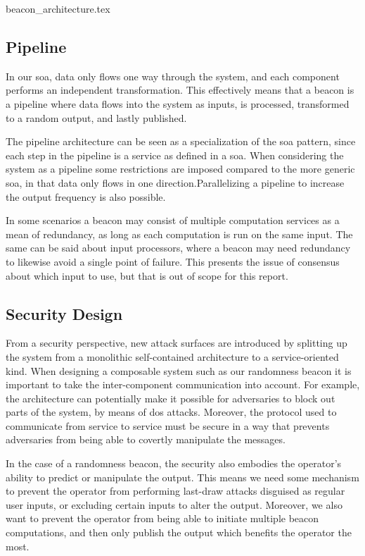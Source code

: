 {beacon_architecture.tex}

\subsection{Pipeline}%
\label{sub:pipeline}
In our \gls{soa}, data only flows one way through the system, and each component performs an independent transformation.
This effectively means that a beacon is a pipeline where data flows into the system as inputs, is processed, transformed to a random output, and lastly published.

The pipeline architecture can be seen as a specialization of the \gls{soa} pattern, since each step in the pipeline is a service as defined in a \gls{soa}.
When considering the system as a pipeline some restrictions are imposed compared to the more generic \gls{soa}, in that data only flows in one direction.Parallelizing a pipeline to increase the output frequency is also possible.

In some scenarios a beacon may consist of multiple computation services as a mean of redundancy, as long as each computation is run on the same input.
The same can be said about input processors, where a beacon may need redundancy to likewise avoid a single point of failure.
This presents the issue of consensus about which input to use, but that is out of scope for this report.

\subsection{Security Design}

From a security perspective, new attack surfaces are introduced by splitting up the system from a monolithic self-contained architecture to a service-oriented kind.
When designing a composable system such as our randomness beacon it is important to take the inter-component communication into account.
For example, the architecture can potentially make it possible for adversaries to block out parts of the system, by means of \gls{dos} attacks.
Moreover, the protocol used to communicate from service to service must be secure in a way that prevents adversaries from being able to covertly manipulate the messages.

In the case of a randomness beacon, the security also embodies the operator's ability to predict or manipulate the output.
This means we need some mechanism to prevent the operator from performing last-draw attacks disguised as regular user inputs, or excluding certain inputs to alter the output.
Moreover, we also want to prevent the operator from being able to initiate multiple beacon computations, and then only publish the output which benefits the operator the most.

